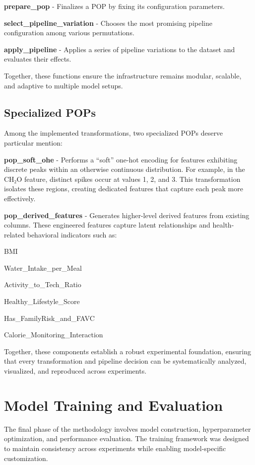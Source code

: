 \textbf{prepare\_pop} - Finalizes a POP by fixing its configuration parameters.

\textbf{select\_pipeline\_variation} - Chooses the most promising pipeline configuration among various permutations.

\textbf{apply\_pipeline} - Applies a series of pipeline variations to the dataset and evaluates their effects.

Together, these functions ensure the infrastructure remains modular, scalable, and adaptive to multiple model setups.

\subsection{Specialized POPs}\label{subsec:specialized-pops}
Among the implemented transformations, two specialized POPs deserve particular mention:

\textbf{pop\_soft\_ohe} - Performs a “soft” one-hot encoding for features exhibiting discrete peaks within an otherwise continuous distribution.
For example, in the CH₂O feature, distinct spikes occur at values 1, 2, and 3.
This transformation isolates these regions, creating dedicated features that capture each peak more effectively.

\textbf{pop\_derived\_features} - Generates higher-level derived features from existing columns.
These engineered features capture latent relationships and health-related behavioral indicators such as:

BMI

Water\_Intake\_per\_Meal

Activity\_to\_Tech\_Ratio

Healthy\_Lifestyle\_Score

Has\_FamilyRisk\_and\_FAVC

Calorie\_Monitoring\_Interaction

Together, these components establish a robust experimental foundation, ensuring that every transformation and pipeline decision can be systematically analyzed, visualized, and reproduced across experiments.


\section{Model Training and Evaluation}\label{sec:model-training-and-evaluation}
The final phase of the methodology involves model construction, hyperparameter optimization, and performance evaluation.
The training framework was designed to maintain consistency across experiments while enabling model-specific customization.

